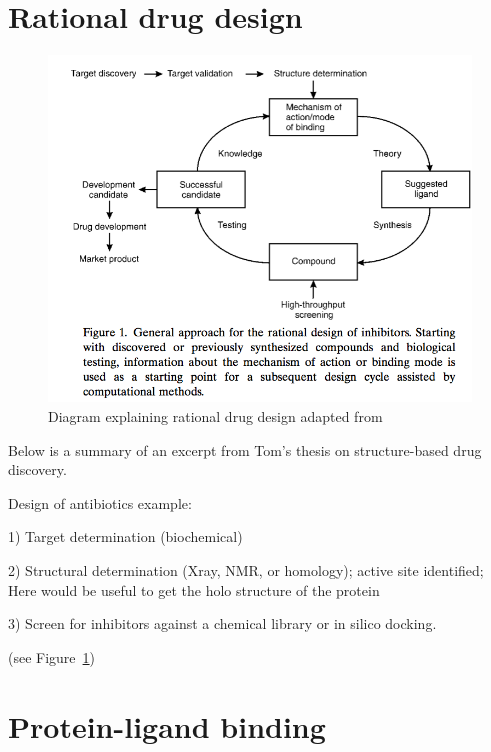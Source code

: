 \section{Rational drug design}

\begin{figure}
	\centering
	\includegraphics[width=6in]{figures/introduction/drug_discovery_flowchart.png}
	\caption[Rational drug design]{Diagram explaining rational drug design adapted from\cite{Gohlke:2002in}}
	\label{fig:rational_drug_design}
\end{figure}

Below is a summary of an excerpt from Tom's thesis on structure-based drug discovery.

Design of antibiotics example: 

1) Target determination (biochemical)

2) Structural determination (Xray, NMR, or homology); active site identified; Here would be useful to get the holo structure of the protein

3) Screen for inhibitors against a chemical library or in silico docking.

(see Figure~\ref{fig:rational_drug_design})

\section{Protein-ligand binding}


